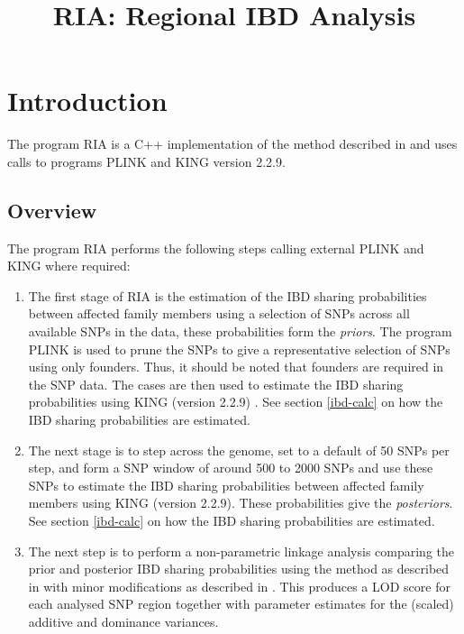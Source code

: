 \documentclass[a4paper,12pt]{article}
\begin{document}
\title{RIA: Regional IBD Analysis}
\date{}
\author{}
\maketitle
\newpage
\tableofcontents
\newpage
\section{Introduction}
\label{introduction}

The program RIA is a C++ implementation of the method described in \citet{nat:15} and uses calls to programs PLINK and KING version 2.2.9.
\subsection{Overview}
\label{overview}

The program RIA performs the following steps calling external PLINK and KING where required: 
\begin{enumerate}

\item The first stage of RIA is the estimation of the IBD sharing probabilities between affected family members using a selection of SNPs across all available SNPs in the data, these probabilities form the {\it priors}. The program PLINK \citet{purcell:etal:07} is used to prune the SNPs to give a representative selection of SNPs using only founders. Thus, it should be noted that founders are required in the SNP data. The cases are then used to estimate the IBD sharing probabilities using KING (version 2.2.9) \citet{manichaikul:etal:10}. See  section \ref{ibd-calc} on how the IBD sharing probabilities are estimated. 
\item The next stage is to step across the genome, set to a default of 50 SNPs per step, and form a SNP window of around 500 to 2000 SNPs and use these SNPs to estimate the IBD sharing probabilities between affected family members using KING (version 2.2.9). These probabilities give the {\it posteriors}. See  section \ref{ibd-calc} on how the IBD sharing probabilities are estimated. 
\item The next step is to perform a non-parametric linkage analysis comparing the prior and posterior IBD sharing probabilities using the method as described in \citet{cordell:etal:00} with minor modifications as described in \citet{nat:15}. This produces a LOD score for each analysed SNP region together with parameter estimates for the (scaled) additive and dominance variances.\end{enumerate}
\end{document}
